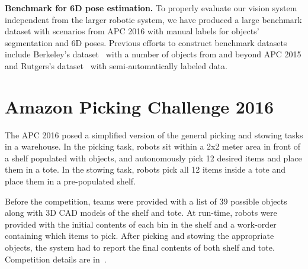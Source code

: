 \documentclass[letterpaper, 10 pt, conference]{ieeeconf}  %
\newcommand{\myparagraph}[1]{\vspace{0.1in}\noindent\textbf{#1}}
\DeclareRobustCommand{\pynote}[1]{\ifthenelse{\boolean{draft-mode}}{\textcolor{green}{\textbf{PY: #1}}}{}}
\begin{document}



\myparagraph{Benchmark for 6D pose estimation.}
To properly evaluate our vision system independent from the larger robotic system, we have produced a large benchmark dataset with scenarios from APC 2016 with manual labels for objects' segmentation and 6D poses. Previous efforts to construct benchmark datasets include Berkeley's dataset~\cite{singh2014bigbird} with a number of objects from and beyond APC 2015 and Rutgers's dataset~\cite{rennie2016dataset} with semi-automatically labeled data. 



\section{Amazon Picking Challenge 2016}


The APC 2016 posed a simplified version of the general picking and stowing tasks in a warehouse. In the picking task, robots sit within a 2x2 meter area in front of a shelf populated with objects, and autonomously pick 12 desired items and place them in a tote. In the stowing task, robots pick all 12 items inside a tote and place them in a pre-populated shelf.

Before the competition, teams were provided with a list of 39 possible objects along with 3D CAD models of the shelf and tote. At run-time, robots were provided with the initial contents of each bin in the shelf and a work-order containing which items to pick. After picking and stowing the appropriate objects, the system had to report the final contents of both shelf and tote. Competition details are in~\cite{apcwebsite}.
\end{document}
